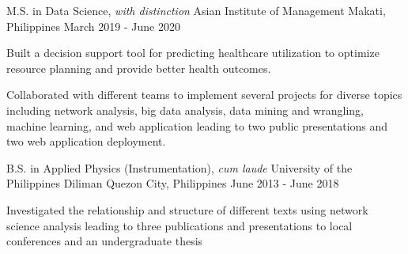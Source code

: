 

\begin{cventries}

  \cventry
    {M.S. in Data Science, \textit{with distinction}} %
    {Asian Institute of Management} %
    {Makati, Philippines} %
    {March 2019 - June 2020} %
    {
      \begin{cvitems} %
        \item{Built a decision support tool for predicting healthcare utilization to optimize resource planning and provide better health outcomes.}
        \item{Collaborated with different teams to implement several projects for diverse topics including network analysis, big data analysis, data mining and wrangling, machine learning, and web application leading to two public presentations and two web application deployment.}
      \end{cvitems}
    }

  \cventry
    {B.S. in Applied Physics (Instrumentation), \textit{cum laude}} %
    {University of the Philippines Diliman} %
    {Quezon City, Philippines} %
    {June 2013 - June 2018} %
    {
      \begin{cvitems} %
        \item{Investigated the relationship and structure of different texts using network
science analysis leading to three publications and presentations to local
conferences and an undergraduate thesis}
      \end{cvitems}
    }
\end{cventries}
